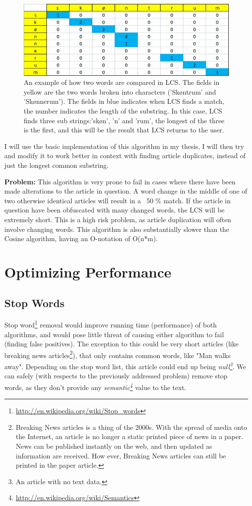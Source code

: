 \begin{figure}[hb]
	\centering
	\includegraphics[scale=0.75]{figures/LcsExplained}
	\caption{An example of how two words are compared in LCS. The fields in yellow are the two words broken into characters ('Skøntrum' and 'Skønnerum'). The fields in blue indicates when LCS finds a match, the number indicates the length of the substring. In this case, LCS finds three sub strings:'skøn', 'n' and 'rum', the longest of the three is the first, and this will be the result that LCS returns to the user. }
\end{figure}

I will use the basic implementation of this algorithm in my thesis, I will then try and modify it to work better in context with finding article duplicates, instead of just the longest common substring.

\textbf{Problem:} This algorithm is very prone to fail in cases where there have been made alterations to the article in question. A word change in the middle of one of two otherwise identical articles will result in a ~50 \% match. If the article in question have been obfuscated with many changed words, the LCS will be extremely short. This is a high risk problem, as article duplication will often involve changing words. This algorithm is also substantially slower than the Cosine algorithm, having an O-notation of O(n*m).


\section{Optimizing Performance}
\subsection{Stop Words}
Stop word\footnote{\url{http://en.wikipedia.org/wiki/Stop_words}} removal would improve running time (performance) of both algorithms, and would pose little threat of causing either algorithm to fail (finding false positives). The exception to this could be very short articles (like breaking news articles\footnote{Breaking News articles is a thing of the 2000s. With the spread of media onto the Internet, an article is no longer a static printed piece of news in a paper. News can be published instantly on the web, and then updated as information are received. How ever, Breaking News articles can still be printed in the paper article.}), that only contains common words, like "Man walks away". Depending on the stop word list, this article could end up being \textit{null\footnote{An article with no text data.}}.
We can safely (with respects to the previously addressed problem) remove stop words, as they don't provide any \textit{semantic\footnote{\url{http://en.wikipedia.org/wiki/Semantics}}} value to the text.

